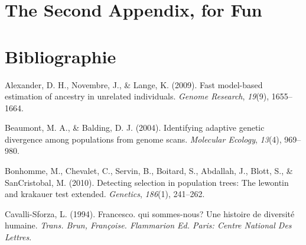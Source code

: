 \documentclass[12pt,twoside]{ugathesis}
\begin{document}
\begin{Shaded}
\begin{Highlighting}[]
  \NormalTok{(} \NormalTok{)}
  
  \StringTok{ }\NormalTok{(}\NormalTok{, }
                  \NormalTok{, }
                  \NormalTok{, }
                  \NormalTok{, }
                  \NormalTok{, }
                  \NormalTok{, }
                  \NormalTok{, }
                  \NormalTok{)}
  \end{Highlighting}
  \end{Shaded}
  \chapter{The Second Appendix, for
  Fun}\label{the-second-appendix-for-fun}
  
  \backmatter
  
  \chapter*{Bibliographie}\label{bibliographie}
  
  \noindent
  
  \setlength{\parindent}{-0.20in} \setlength{\leftskip}{0.20in}
  \setlength{\parskip}{8pt}
  
  \hypertarget{refs}{}
  \hypertarget{ref-alexander2009fast}{}
  Alexander, D. H., Novembre, J., \& Lange, K. (2009). Fast model-based
  estimation of ancestry in unrelated individuals. \emph{Genome Research},
  \emph{19}(9), 1655--1664.
  
  \hypertarget{ref-beaumont2004identifying}{}
  Beaumont, M. A., \& Balding, D. J. (2004). Identifying adaptive genetic
  divergence among populations from genome scans. \emph{Molecular
  Ecology}, \emph{13}(4), 969--980.
  
  \hypertarget{ref-bonhomme2010detecting}{}
  Bonhomme, M., Chevalet, C., Servin, B., Boitard, S., Abdallah, J.,
  Blott, S., \& SanCristobal, M. (2010). Detecting selection in population
  trees: The lewontin and krakauer test extended. \emph{Genetics},
  \emph{186}(1), 241--262.
  
  \hypertarget{ref-cavalli1994francesco}{}
  Cavalli-Sforza, L. (1994). Francesco. qui sommes-nous? Une histoire de
  diversité humaine. \emph{Trans. Brun, Françoise. Flammarion Ed. Paris:
  Centre National Des Lettres}.
  
\end{document}
